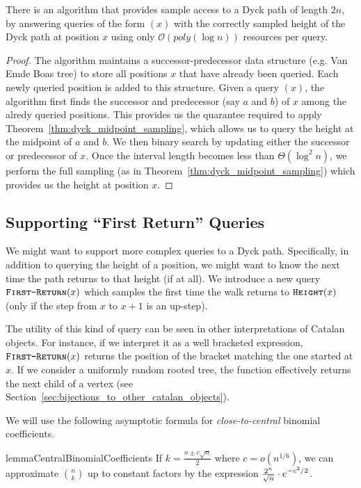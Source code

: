 \begin{theorem}
\label{thm:dyck_height_sampling}
There is an algorithm that provides sample access to a Dyck path of length $2n$,
by answering queries of the form $(x)$ with the correctly sampled height of the Dyck path at position $x$
using only $\mathcal O(poly(\log n))$ resources per query.
\end{theorem}
\begin{proof}
The algorithm maintains a successor-predecessor data structure (e.g. Van Emde Boas tree)
to store all positions $x$ that have already been queried.
Each newly queried position is added to this structure.
Given a query $(x)$, the algorithm first finds the successor and predecessor
(say $a$ and $b$) of $x$ among the alredy queried positions.
This provides us the quarantee required to apply Theorem~\ref{thm:dyck_midpoint_sampling},
which allows us to query the height at the midpoint of $a$ and $b$.
We then binary search by updating either the successor or predecessor of $x$.
Once the interval length becomes less than $\Theta(\log^2 n)$,
we perform the full sampling (as in Theorem~\ref{thm:dyck_midpoint_sampling}) which provides us the height at position $x$.
\end{proof}




\subsection{Supporting ``First Return'' Queries}%
\label{sec:supporting_first_return_queries}

We might want to support more complex queries to a Dyck path.
Specifically, in addition to querying the height of a position, we might want to know the next time the path returns to that height (if at all).
We introduce a new query $\texttt{\textsc{First-Return}}(x)$ which samples the first time the walk returns to $\texttt{\textsc{Height}}(x)$
(only if the step from $x$ to $x+1$ is an up-step).

The utility of this kind of query can be seen in other interpretations of Catalan objects.
For instance, if we interpret it as a well bracketed expression,
$\texttt{\textsc{First-Return}}(x)$ returns the position of the bracket matching the one started at $x$.
If we consider a uniformly random rooted tree,
the function effectively returns the next child of a vertex (see Section~\ref{sec:bijections_to_other_catalan_objects}).

We will use the following asymptotic formula for \emph{close-to-central} binomial coefficients.
\begin{restatable}{lemma}{CentralBinomialCoefficients}
\label{lem:CentralBinomialCoefficients}
If $k = \frac{n \pm c\sqrt n}{2}$ where $c = o(n^{1/6})$,
we can approximate $\binom{n}{k}$ up to constant factors by the expression $\frac{2^n}{\sqrt n}\cdot \mathlarger e^{-c^2/2}$.
\end{restatable}

